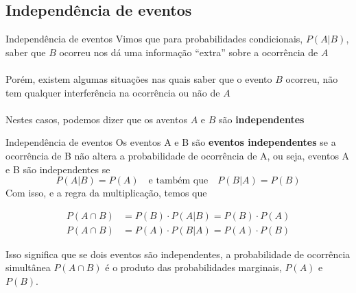 \documentclass[10pt]{beamer}\usepackage[]{graphicx}\usepackage[]{color}
\theoremstyle{definition}
\begin{document}

\subsection{Independência de eventos}

\begin{frame}{Independência de eventos}
  Vimos que para probabilidades condicionais, $P(A|B)$, saber que $B$
  ocorreu nos dá uma informação ``extra'' sobre a ocorrência de $A$ \\~\\
  Porém, existem algumas situações nas quais saber que o evento $B$
  ocorreu, não tem qualquer interferência na ocorrência ou não de $A$\\~\\
  Nestes casos, podemos dizer que os aventos $A$ e $B$ são
  \textbf{independentes}
\end{frame}

\begin{frame}{Independência de eventos}
  Os eventos A e B são \textbf{eventos independentes} se a ocorrência de
  B não altera a probabilidade de ocorrência de A, ou seja, eventos A e
  B são independentes se
  \begin{equation*}
    P(A|B) = P(A) \quad \text{e também que} \quad P(B|A) = P(B)
  \end{equation*}
  Com isso, e a regra da multiplicação, temos que
  \begin{block}{}
    \begin{align*}
      P(A \cap B) &= P(B) \cdot P(A|B) = P(B) \cdot P(A) \\
      P(A \cap B) &= P(A) \cdot P(B|A) = P(A) \cdot P(B)
    \end{align*}
  \end{block}
  Isso significa que se dois eventos são independentes, a probabilidade
  de ocorrência simultânea $P(A \cap B)$ é o produto das probabilidades
  marginais, $P(A)$ e $P(B)$.
\end{frame}
\end{document}
